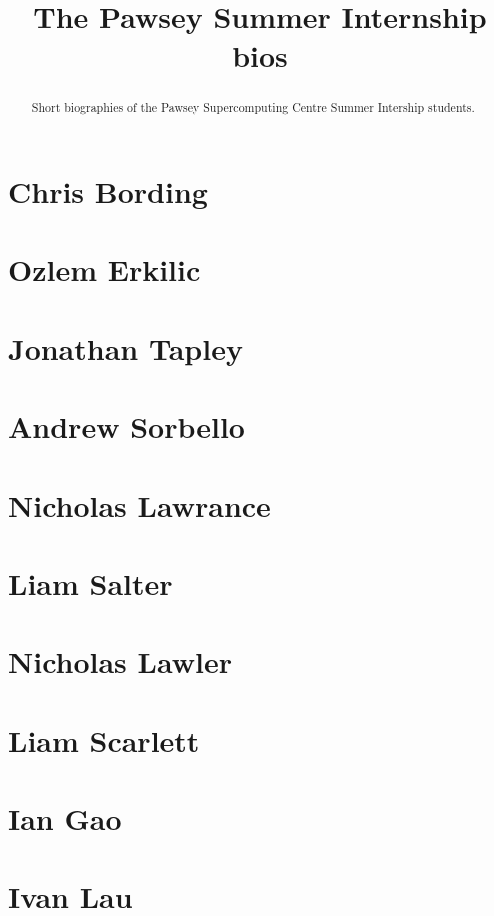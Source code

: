 \documentclass[11pt,a4paper]{report}
\title{The Pawsey Summer Internship bios}
\begin{document}
\maketitle
\tableofcontents


\begin{abstract}

Short biographies of the Pawsey Supercomputing Centre Summer Intership students.

\end{abstract}

\chapter{Chris Bording}


\chapter{Ozlem Erkilic}


\chapter{Jonathan Tapley}

\chapter{Andrew Sorbello}

\chapter{Nicholas Lawrance}


\chapter{Liam Salter}


\chapter{Nicholas Lawler}


\chapter{Liam Scarlett}


\chapter{Ian Gao}


\chapter{Ivan Lau}

\end{document}
